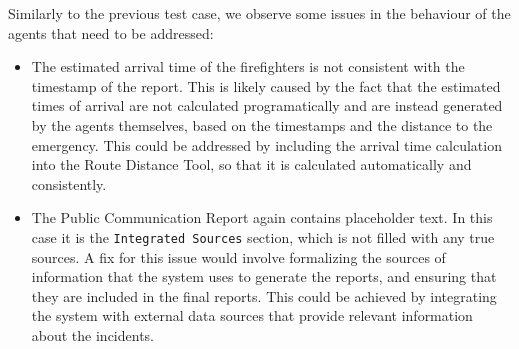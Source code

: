Similarly to the previous test case, we observe some issues in the behaviour of the agents that need to be addressed:
\begin{itemize}
    \item The estimated arrival time of the firefighters is not consistent with the timestamp of the report. This is likely caused by the fact that the estimated times of arrival are not calculated programatically and are instead generated by the agents themselves, based on the timestamps and the distance to the emergency. This could be addressed by including the arrival time calculation into the Route Distance Tool, so that it is calculated automatically and consistently.
    \item The Public Communication Report again contains placeholder text. In this case it is the \texttt{Integrated Sources} section, which is not filled with any true sources. A fix for this issue would involve formalizing the sources of information that the system uses to generate the reports, and ensuring that they are included in the final reports. This could be achieved by integrating the system with external data sources that provide relevant information about the incidents.
\end{itemize}